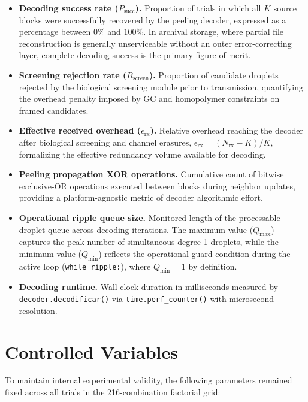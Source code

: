\begin{itemize}
    \item \textbf{Decoding success rate ($P_{\text{succ}}$).} Proportion of trials in which all $K$ source blocks were successfully recovered by the peeling decoder, expressed as a percentage between $0\%$ and $100\%$. In archival storage, where partial file reconstruction is generally unserviceable without an outer error-correcting layer, complete decoding success is the primary figure of merit.

    \item \textbf{Screening rejection rate ($R_{\text{screen}}$).} Proportion of candidate droplets rejected by the biological screening module prior to transmission, quantifying the overhead penalty imposed by GC and homopolymer constraints on framed candidates.

    \item \textbf{Effective received overhead ($\epsilon_{\text{rx}}$).} Relative overhead reaching the decoder after biological screening and channel erasures, $\epsilon_{\text{rx}} = (N_{\text{rx}} - K)/K$, formalizing the effective redundancy volume available for decoding.

    \item \textbf{Peeling propagation XOR operations.} Cumulative count of bitwise exclusive-OR operations executed between blocks during neighbor updates, providing a platform-agnostic metric of decoder algorithmic effort.

    \item \textbf{Operational ripple queue size.} Monitored length of the processable droplet queue across decoding iterations. The maximum value ($Q_{\max}$) captures the peak number of simultaneous degree-1 droplets, while the minimum value ($Q_{\min}$) reflects the operational guard condition during the active loop (\texttt{while ripple:}), where $Q_{\min} = 1$ by definition.

    \item \textbf{Decoding runtime.} Wall-clock duration in milliseconds measured by \texttt{decoder.\allowbreak decodificar()} via \texttt{time.perf\_counter()} with microsecond resolution.
\end{itemize}

\section{Controlled Variables}
\label{sec:controlled_variables}

To maintain internal experimental validity, the following parameters remained fixed across all trials in the 216-combination factorial grid:

